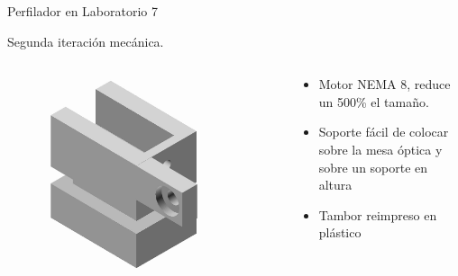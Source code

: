 \begin{frame}{Perfilador en Laboratorio 7}
\begin{onlyenv}
    Segunda iteración mecánica.
    \begin{columns}[c]
        \begin{column}{0.4\textwidth}
            \begin{figure}
                \centering
                \includegraphics[width=0.8\textwidth]{fig/perfilador/soporte_labo7_2}
             
                \label{fig:soporte_labo7}
            \end{figure}
        \end{column}
        \begin{column}{0.5\textwidth}
            \begin{itemize}
                \item  Motor NEMA 8, reduce un 500\% el tamaño.
                \item  Soporte fácil de colocar sobre la mesa óptica y sobre un soporte en altura
                \item  Tambor reimpreso en plástico
            \end{itemize}
            
        \end{column}
    \end{columns}
    \end{onlyenv}
\end{frame}
